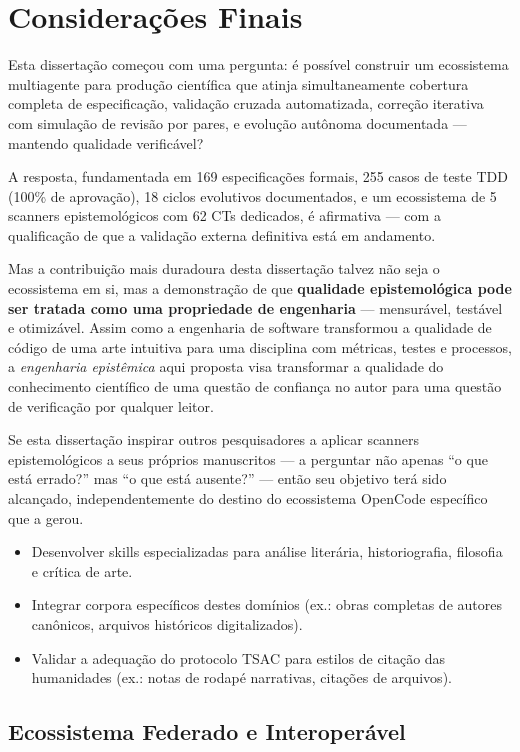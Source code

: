 \section{Considerações Finais}

Esta dissertação começou com uma pergunta: é possível construir um ecossistema multiagente para produção científica que atinja simultaneamente cobertura completa de especificação, validação cruzada automatizada, correção iterativa com simulação de revisão por pares, e evolução autônoma documentada --- mantendo qualidade verificável?

A resposta, fundamentada em 169 especificações formais, 255 casos de teste TDD (100\% de aprovação), 18 ciclos evolutivos documentados, e um ecossistema de 5 scanners epistemológicos com 62 CTs dedicados, é afirmativa --- com a qualificação de que a validação externa definitiva está em andamento.

Mas a contribuição mais duradoura desta dissertação talvez não seja o ecossistema em si, mas a demonstração de que \textbf{qualidade epistemológica pode ser tratada como uma propriedade de engenharia} --- mensurável, testável e otimizável. Assim como a engenharia de software transformou a qualidade de código de uma arte intuitiva para uma disciplina com métricas, testes e processos, a \textit{engenharia epistêmica} aqui proposta visa transformar a qualidade do conhecimento científico de uma questão de confiança no autor para uma questão de verificação por qualquer leitor.

Se esta dissertação inspirar outros pesquisadores a aplicar scanners epistemológicos a seus próprios manuscritos --- a perguntar não apenas ``o que está errado?'' mas ``o que está ausente?'' --- então seu objetivo terá sido alcançado, independentemente do destino do ecossistema OpenCode específico que a gerou.

\begin{itemize}
  \item Desenvolver skills especializadas para análise literária, historiografia, filosofia e crítica de arte.
  \item Integrar corpora específicos destes domínios (ex.: obras completas de autores canônicos, arquivos históricos digitalizados).
  \item Validar a adequação do protocolo TSAC para estilos de citação das humanidades (ex.: notas de rodapé narrativas, citações de arquivos).
\end{itemize}

\subsection{Ecossistema Federado e Interoperável}


